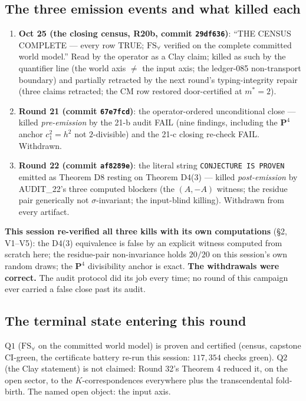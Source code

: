 \documentclass[11pt]{article}
\begin{document}
\subsection*{The three emission events and what killed each}

\begin{enumerate}[label=(E\arabic*)]
\item \textbf{Oct 25 (the closing census, R20b, commit \texttt{29df636})}:
``THE CENSUS COMPLETE --- every row TRUE; $\mathrm{FS}_\forall$ verified on the
complete committed world model.'' Read by the operator as a Clay claim; killed
as such by the quantifier line (the world axis $\neq$ the input axis; the
ledger-085 non-transport boundary) and partially retracted by the next round's
typing-integrity repair (three claims retracted; the CM row restored
door-certified at $m^*=2$).
\item \textbf{Round 21 (commit \texttt{67e7fcd})}: the operator-ordered
unconditional close --- killed \emph{pre-emission} by the 21-b audit FAIL
(nine findings, including the $\mathbf{P}^4$ anchor $c_1^2=h^2$ not
$2$-divisible) and the 21-c closing re-check FAIL. Withdrawn.
\item \textbf{Round 22 (commit \texttt{af8289e})}: the literal string
\texttt{CONJECTURE IS PROVEN} emitted as Theorem D8 resting on Theorem
D4(3) --- killed \emph{post-emission} by AUDIT\_22's three computed blockers
(the $(A,-A)$ witness; the residue pair generically not $\sigma$-invariant;
the input-blind killing). Withdrawn from every artifact.
\end{enumerate}

\noindent\textbf{This session re-verified all three kills with its own
computations} (\S2, V1--V5): the D4(3) equivalence is false by an explicit
witness computed from scratch here; the residue-pair non-invariance holds
$20/20$ on this session's own random draws; the $\mathbf{P}^4$ divisibility
anchor is exact. \textbf{The withdrawals were correct.} The audit protocol
did its job every time; no round of this campaign ever carried a false close
past its audit.

\subsection*{The terminal state entering this round}
$\mathrm{Q1}$ ($\mathrm{FS}_\forall$ on the committed world model) is proven
and certified (census, capstone CI-green, the certificate battery re-run this
session: $117{,}354$ checks green). $\mathrm{Q2}$ (the Clay statement) is not
claimed: Round 32's Theorem 4 reduced it, on the open sector, to the
$K$-correspondences everywhere plus the transcendental fold-birth. The
named open object: the input axis.
\end{document}
